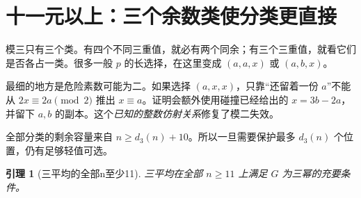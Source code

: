 \documentclass[11pt,a4paper,oneside,openany]{book}
\newtheorem{lemma}[theorem]{引理}
\theoremstyle{definition}
\numberwithin{equation}{chapter}
\begin{document}
\section{十一元以上：三个余数类使分类更直接}
模三只有三个类。有四个不同三重值，就必有两个同余；有三个三重值，就看它们是否各占一类。很多一般 $p$ 的长选择，在这里变成 $(a,a,x)$ 或 $(a,b,x)$。

最细的地方是危险素数可能为二。如果选择 $(a,x,x)$，只靠“还留着一份 $a$”不能从 $2x\equiv2a\pmod2$ 推出 $x\equiv a$。证明会额外使用碰撞已经给出的 $x=3b-2a$，并留下 $a,b$ 的副本。这个\emph{已知的整数仿射关系}修复了模二失效。

全部分类的剩余容量来自 $n\ge d_3(n)+10$。所以一旦需要保护最多 $d_3(n)$ 个位置，仍有足够轻值可选。
\begin{lemma}[三平均的全部n至少11]\label{lem:triple-large}
三平均在全部 $n\ge11$ 上满足 $G$ 为三幂的充要条件。
\end{lemma}
\end{document}
